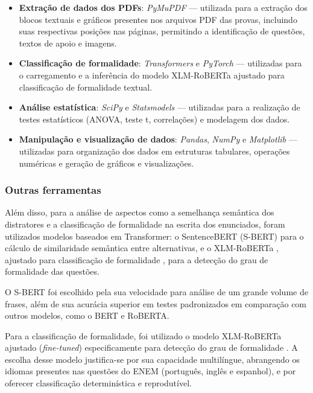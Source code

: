 \documentclass[a4paper,10pt, twocolumn]{article}
\begin{document}
\begin{itemize}
    \item \textbf{Extração de dados dos PDFs}: \textit{PyMuPDF} — utilizada para a extração dos blocos textuais e gráficos presentes nos arquivos PDF das provas, incluindo suas respectivas posições nas páginas, permitindo a identificação de questões, textos de apoio e imagens.
    
    \item \textbf{Classificação de formalidade}: \textit{Transformers} e \textit{PyTorch} — utilizadas para o carregamento e a inferência do modelo XLM-RoBERTa ajustado para classificação de formalidade textual.
    
    \item \textbf{Análise estatística}: \textit{SciPy} e \textit{Statsmodels} — utilizadas para a realização de testes estatísticos (ANOVA, teste t, correlações) e modelagem dos dados.
    
    \item \textbf{Manipulação e visualização de dados}: \textit{Pandas}, \textit{NumPy} e \textit{Matplotlib} — utilizadas para organização dos dados em estruturas tabulares, operações numéricas e geração de gráficos e visualizações.
\end{itemize}


\subsubsection{Outras ferramentas}
Além disso, para a análise de aspectos como a semelhança semântica dos distratores e a classificação de formalidade na escrita dos enunciados, foram utilizados modelos baseados em Transformer: o SentenceBERT (S-BERT) \cite{reimers_sentence-bert_2019} para o cálculo de similaridade semântica entre alternativas, e o XLM-RoBERTa \cite{conneau2020unsupervised}, ajustado para classificação de formalidade \cite{dementieva2023detecting}, para a detecção do grau de formalidade das questões.

O S-BERT foi escolhido pela sua velocidade para análise de um grande volume de frases, além de sua acurácia superior em testes padronizados em comparação com outros modelos, como o BERT e RoBERTA. \cite{reimers_sentence-bert_2019}

Para a classificação de formalidade, foi utilizado o modelo XLM-RoBERTa \cite{conneau2020unsupervised} ajustado (\textit{fine-tuned}) especificamente para detecção do grau de formalidade \cite{dementieva2023detecting}. A escolha desse modelo justifica-se por sua capacidade multilíngue, abrangendo os idiomas presentes nas questões do ENEM (português, inglês e espanhol), e por oferecer classificação determinística e reprodutível.
\end{document}
